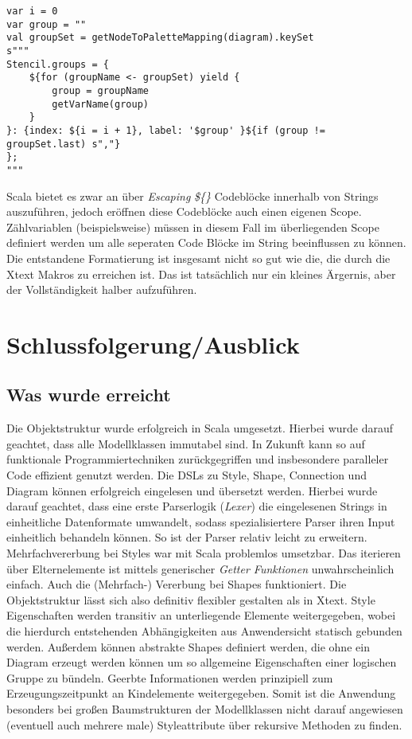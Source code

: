 \begin{lstlisting}[style = scala, caption = {String der in Scala über Interpolation modifiziert wird}, label = {lst:scalastring}]
var i = 0
var group = ""
val groupSet = getNodeToPaletteMapping(diagram).keySet
s"""
Stencil.groups = {
	${for (groupName <- groupSet) yield {
		group = groupName
		getVarName(group)
	}
}: {index: ${i = i + 1}, label: '$group' }${if (group != groupSet.last) s","}
};
"""
\end{lstlisting}Scala bietet es zwar an über \textit{Escaping} \textit{\$\{\}} Codeblöcke innerhalb von Strings auszuführen, jedoch eröffnen diese Codeblöcke auch einen eigenen Scope. Zählvariablen (beispielsweise) müssen in diesem Fall im überliegenden Scope definiert werden um alle seperaten Code Blöcke im String beeinflussen zu können. Die entstandene Formatierung ist insgesamt nicht so gut wie die, die durch die Xtext Makros zu erreichen ist. Das ist tatsächlich nur ein kleines Ärgernis, aber der Vollständigkeit halber aufzuführen.

\section{Schlussfolgerung/Ausblick}
\subsection{Was wurde erreicht}
Die Objektstruktur wurde erfolgreich in Scala umgesetzt. Hierbei wurde darauf geachtet, dass alle Modellklassen immutabel sind. In Zukunft kann so auf funktionale Programmiertechniken zurückgegriffen und insbesondere paralleler Code effizient genutzt werden. Die DSLs zu Style, Shape, Connection und Diagram können erfolgreich eingelesen und übersetzt werden. Hierbei wurde darauf geachtet, dass eine erste Parserlogik (\textit{Lexer}) die eingelesenen Strings in einheitliche Datenformate umwandelt, sodass spezialisiertere Parser ihren Input einheitlich behandeln können. So ist der Parser relativ leicht zu erweitern. Mehrfachvererbung bei Styles war mit Scala problemlos umsetzbar. Das iterieren über Elternelemente ist mittels generischer \textit{Getter Funktionen} unwahrscheinlich einfach. Auch die (Mehrfach-) Vererbung bei Shapes funktioniert. Die Objektstruktur lässt sich also definitiv flexibler gestalten als in Xtext. Style Eigenschaften werden transitiv an unterliegende Elemente weitergegeben, wobei die hierdurch entstehenden Abhängigkeiten aus Anwendersicht statisch gebunden werden. Außerdem können abstrakte Shapes definiert werden, die ohne ein Diagram erzeugt werden können um so allgemeine Eigenschaften einer logischen Gruppe zu bündeln. Geerbte Informationen werden prinzipiell zum Erzeugungszeitpunkt an Kindelemente weitergegeben. Somit ist die Anwendung besonders bei großen Baumstrukturen der Modellklassen nicht darauf angewiesen (eventuell auch mehrere male) Styleattribute über rekursive Methoden zu finden. 
